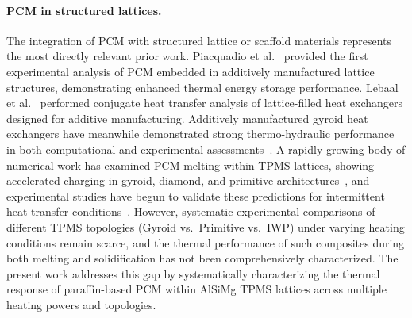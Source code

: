 \paragraph{PCM in structured lattices.}
The integration of PCM with structured lattice or scaffold materials represents the most directly relevant prior work. Piacquadio et al.~\cite{piacquadio2022experimental} provided the first experimental analysis of PCM embedded in additively manufactured lattice structures, demonstrating enhanced thermal energy storage performance. Lebaal et al.~\cite{lebaal2020conjugate} performed conjugate heat transfer analysis of lattice-filled heat exchangers designed for additive manufacturing. Additively manufactured gyroid heat exchangers have meanwhile demonstrated strong thermo-hydraulic performance in both computational and experimental assessments~\cite{mahmoud2023enhancement,yan2024thermohydraulic,lai2025development,yu2025data,palomba2025thermal,daifalla2024multi}. A rapidly growing body of numerical work has examined PCM melting within TPMS lattices, showing accelerated charging in gyroid, diamond, and primitive architectures~\cite{ghafoorian2025numerical,gado2024improving,gado2025thermal,gado2026efficient,su2026thermal,elsihy2026melting,fan2023investigation,avivi2023ihtc,wang2026modulation,molteni2023improving,molteni2026tuning}, and experimental studies have begun to validate these predictions for intermittent heat transfer conditions~\cite{arqam2025computational,wang2024experimental,zhang2023ihtc,zhang2023heat}. However, systematic experimental comparisons of different TPMS topologies (Gyroid vs.\ Primitive vs.\ IWP) under varying heating conditions remain scarce, and the thermal performance of such composites during both melting and solidification has not been comprehensively characterized. The present work addresses this gap by systematically characterizing the thermal response of paraffin-based PCM within AlSiMg TPMS lattices across multiple heating powers and topologies.

